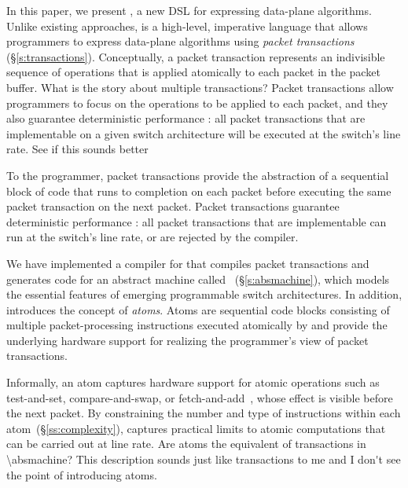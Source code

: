 In this paper, we present \pktlanguage, a new DSL for expressing data-plane
algorithms. Unlike existing approaches, \pktlanguage is a high-level,
imperative language that allows programmers to express data-plane algorithms
using {\em packet transactions} (\S\ref{s:transactions}). 
Conceptually, a packet transaction represents an indivisible 
sequence of operations that is applied atomically 
to each packet in the packet buffer. 
\ac{What is the story about multiple transactions?}
Packet transactions allow programmers to focus on the operations to be applied
to each packet, and they also 
guarantee deterministic performance :
all packet transactions that are implementable on a given switch architecture
will be executed at the switch's line rate.
\ac{See if this sounds better}

To the programmer,
packet transactions provide the abstraction of a sequential block of code that
runs to completion on each packet before executing the same packet transaction
on the next packet. 
Packet transactions guarantee deterministic performance :
all packet transactions that are implementable can run at the switch's line
rate, or are rejected by the compiler. 
\fi

We have implemented a compiler for \pktlanguage that compiles \pktlanguage packet
transactions and generates code for an abstract machine
called \absmachine~(\S\ref{s:absmachine}), which models the essential features of
emerging programmable switch architectures.  In addition, \absmachine
introduces the concept of {\em atoms}. Atoms are sequential code blocks
consisting of multiple packet-processing instructions executed atomically by
\absmachine and provide the underlying hardware support for realizing the
programmer's view of packet transactions.

Informally, an atom captures hardware support for atomic operations such as
test-and-set, compare-and-swap, or fetch-and-add~\cite{faa}, whose effect is
visible before the next packet. By constraining the number and type of
instructions within each atom~(\S\ref{ss:complexity}), \absmachine captures
practical limits to atomic computations that can be carried out at line rate.
\ac{Are atoms the equivalent of transactions in \absmachine? This description
sounds just like transactions to me and I don't see the point of introducing
atoms.}




